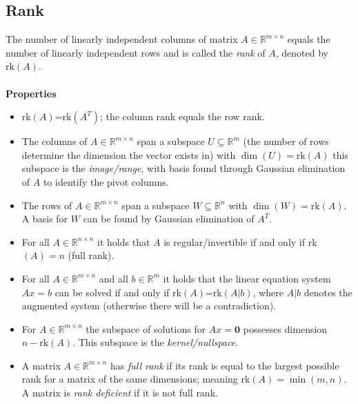 \documentclass{report}
\begin{document}
\subsection{Rank} %
The number of linearly independent columns of matrix $A\in\mathbb{R}^{m\times n}$ equals the number
of linearly independent rows and is called the \textit{rank} of $A$, denoted by $\text{rk}(A)$.\\
\vspace{1mm}\\
\textbf{Properties}
\begin{itemize}
\item rk$(A)$=rk$(A^T)$; the column rank equals the row rank.
\item The columns of $A\in\mathbb{R}^{m\times n}$ span a subspace $U\subseteq\mathbb{R}^m$ 
(the number of rows determine the dimension the vector exists in) 
with $\dim(U)=\text{rk}(A)$ this subspace is the \textit{image/range}, with basis found 
through Gaussian elimination of $A$ to identify the pivot columns.
\item The rows of $A\in\mathbb{R}^{m\times n}$ span a subspace $W\subseteq\mathbb{R}^n$
with $\dim(W)=\text{rk}(A)$. A basis for $W$ can be found by Gaussian elimination of $A^T$.
\item For all $A\in\mathbb{R}^{n\times n}$ it holds that $A$ is regular/invertible if and only if
rk$(A)=n$ (full rank).
\item For all $A\in\mathbb{R}^{m\times n}$ and all $b\in\mathbb{R}^m$
it holds that the linear equation system $Ax=b$ can be solved if and only if rk$(A)$=rk$(A|b)$, 
where $A|b$ denotes the augmented system (otherwise there will be a contradiction).
\item For $A\in\mathbb{R}^{m\times n}$ the subspace of solutions for $Ax=\mathbf{0}$ possesses dimension
$n-\text{rk}(A)$. This subspace is the \textit{kernel/nullspace}.
\item A matrix $A\in\mathbb{R}^{m\times n}$ has \textit{full rank} if its rank is equal to the largest
possible rank for a matrix of the same dimensions; meaning rk$(A)=\min(m,n)$. A matrix is \textit{rank deficient} if it is not full rank.
\end{itemize}
\newpage
\end{document}
